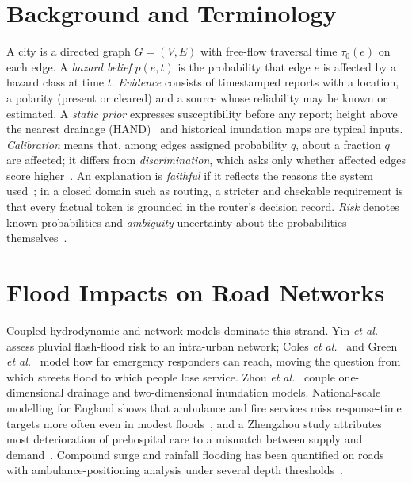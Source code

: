 \documentclass[journal]{IEEEtran}
\begin{document}
\section{Background and Terminology}\label{sec:background}
A city is a directed graph $G=(V,E)$ with free-flow traversal time $\tau_0(e)$ on each edge. A \emph{hazard belief} $p(e,t)$ is the probability that edge $e$ is affected by a hazard class at time $t$. \emph{Evidence} consists of timestamped reports with a location, a polarity (present or cleared) and a source whose reliability may be known or estimated. A \emph{static prior} expresses susceptibility before any report; height above the nearest drainage (HAND)~\cite{nobre2011hand} and historical inundation maps are typical inputs. \emph{Calibration} means that, among edges assigned probability $q$, about a fraction $q$ are affected; it differs from \emph{discrimination}, which asks only whether affected edges score higher~\cite{fawcett2006roc}. An explanation is \emph{faithful} if it reflects the reasons the system used~\cite{jacovi2020faithful}; in a closed domain such as routing, a stricter and checkable requirement is that every factual token is grounded in the router's decision record. \emph{Risk} denotes known probabilities and \emph{ambiguity} uncertainty about the probabilities themselves~\cite{ellsberg1961risk}.

\section{Flood Impacts on Road Networks}\label{sec:impacts}
Coupled hydrodynamic and network models dominate this strand. Yin \emph{et al.}~\cite{yin2016shanghai} assess pluvial flash-flood risk to an intra-urban network; Coles \emph{et al.}~\cite{coles2017york} and Green \emph{et al.}~\cite{green2017emergency} model how far emergency responders can reach, moving the question from which streets flood to which people lose service. Zhou \emph{et al.}~\cite{zhou2022connectivity} couple one-dimensional drainage and two-dimensional inundation models. National-scale modelling for England shows that ambulance and fire services miss response-time targets more often even in modest floods~\cite{yu2020disruption}, and a Zhengzhou study attributes most deterioration of prehospital care to a mismatch between supply and demand~\cite{chen2025ems}. Compound surge and rainfall flooding has been quantified on roads with ambulance-positioning analysis under several depth thresholds~\cite{tahvildari2022compound}.
\end{document}
